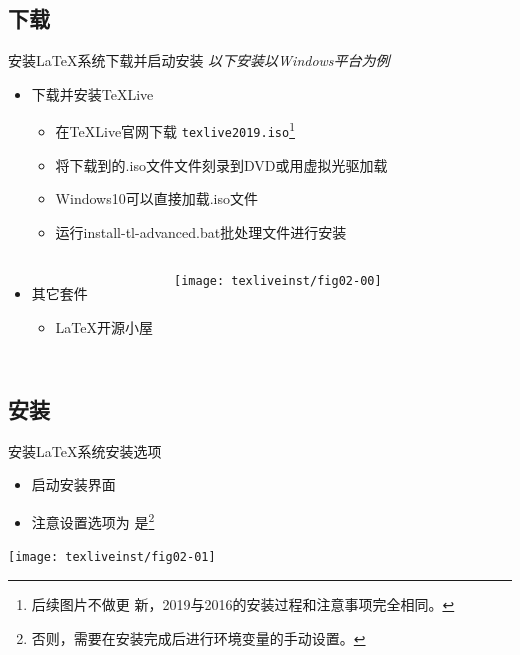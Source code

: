 \documentclass[fontset = none, xcolor=svgnames, t, aspectratio=169]{ctexbeamer}
\begin{document}
\subsection[下载]{下载}
\begin{frame}[t]{安装\LaTeX 系统}{下载并启动安装}
  \stretchon
  \emph{以下安装以Windows平台为例}
  \begin{itemize}
  \item 下载并安装\TeX Live
    \begin{itemize}
    \item 在\TeX Live官网下载
      \texttt{texlive2019.iso}\footnote[frame, 1]{后续图片不做更
        新，2019与2016的安装过程和注意事项完全相同。}
    \item 将下载到的.iso文件文件刻录到DVD或用虚拟光驱加载
    \item Windows10可以\alert{直接加载}.iso文件
    \item 运行install-tl-advanced.bat批处理文件进行安装
    \end{itemize}
  \end{itemize}
  \vspace{-3ex}
  \begin{columns}[T]
  \begin{itemize}  
  \item 其它套件
    \begin{itemize}
    \item {\LaTeX 开源小屋}
    \end{itemize}
  \end{itemize}
  \centering%
  \texttt{[image: texliveinst/fig02-00]}
  \end{columns}
  \stretchoff
\end{frame}
\subsection[安装]{安装}
\begin{frame}[t]{安装\LaTeX 系统}{安装选项}
  \begin{itemize}
  \item 启动安装界面
  \item 注意设置选项为
    \alert{是}\footnote[frame, 1]{否则，需要在安装完成后进行环境变量的手动设置。}
  \end{itemize}
  \centering
  \begin{annotatedFigure}
    {\texttt{[image: texliveinst/fig02-01]}}
  \end{annotatedFigure}  
\end{frame}
\end{document}
